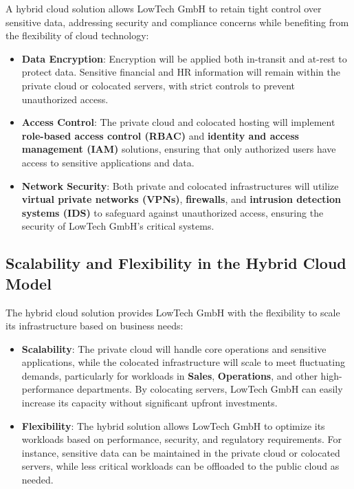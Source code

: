A hybrid cloud solution allows LowTech GmbH to retain tight control over sensitive data, addressing security and compliance concerns while benefiting from the flexibility of cloud technology:

\begin{itemize}
    \item \textbf{Data Encryption}: Encryption will be applied both in-transit and at-rest to protect data. Sensitive financial and HR information will remain within the private cloud or colocated servers, with strict controls to prevent unauthorized access.
    
    \item \textbf{Access Control}: The private cloud and colocated hosting will implement \textbf{role-based access control (RBAC)} and \textbf{identity and access management (IAM)} solutions, ensuring that only authorized users have access to sensitive applications and data.
    
    \item \textbf{Network Security}: Both private and colocated infrastructures will utilize \textbf{virtual private networks (VPNs)}, \textbf{firewalls}, and \textbf{intrusion detection systems (IDS)} to safeguard against unauthorized access, ensuring the security of LowTech GmbH’s critical systems.
\end{itemize}

\subsection{Scalability and Flexibility in the Hybrid Cloud Model}

The hybrid cloud solution provides LowTech GmbH with the flexibility to scale its infrastructure based on business needs:

\begin{itemize}
    \item \textbf{Scalability}: The private cloud will handle core operations and sensitive applications, while the colocated infrastructure will scale to meet fluctuating demands, particularly for workloads in \textbf{Sales}, \textbf{Operations}, and other high-performance departments. By colocating servers, LowTech GmbH can easily increase its capacity without significant upfront investments.
    
    \item \textbf{Flexibility}: The hybrid solution allows LowTech GmbH to optimize its workloads based on performance, security, and regulatory requirements. For instance, sensitive data can be maintained in the private cloud or colocated servers, while less critical workloads can be offloaded to the public cloud as needed.
\end{itemize}

